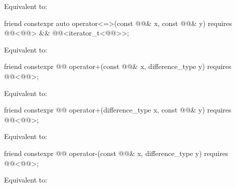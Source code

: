 \begin{itemdescr}
\pnum
\effects
Equivalent to: 
\end{itemdescr}

%
\begin{itemdecl}
friend constexpr auto operator<=>(const @@& x, const @@& y)
  requires @@<@@> && @@<iterator_t<@@>>;
\end{itemdecl}

\begin{itemdescr}
\pnum
\effects
Equivalent to: 
\end{itemdescr}

%
\begin{itemdecl}
friend constexpr @@ operator+(const @@& x, difference_type y)
  requires @@<@@>;
\end{itemdecl}

\begin{itemdescr}
\pnum
\effects
Equivalent to: 
\end{itemdescr}

%
\begin{itemdecl}
friend constexpr @@ operator+(difference_type x, const @@& y)
  requires @@<@@>;
\end{itemdecl}

\begin{itemdescr}
\pnum
\effects
Equivalent to: 
\end{itemdescr}

%
\begin{itemdecl}
friend constexpr @@ operator-(const @@& x, difference_type y)
  requires @@<@@>;
\end{itemdecl}

\begin{itemdescr}
\pnum
\effects
Equivalent to: 
\end{itemdescr}

